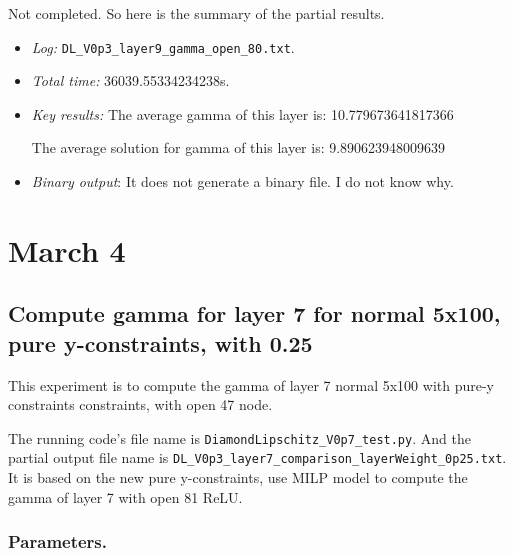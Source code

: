 \documentclass{llncs}
\begin{document}
Not completed. So here is the summary of the partial results.

\begin{itemize}
	\item \emph{Log:} \verb*|DL_V0p3_layer9_gamma_open_80.txt|.
	
	\item \emph{Total time:} 36039.55334234238s.
	
	\item \emph{Key results:}  The average gamma of this layer is:  10.779673641817366
	
	The average solution for gamma of this layer is:  9.890623948009639
	
	\item  \emph{Binary output}: It does not generate a binary file. I do not know why.
	
\end{itemize}

\section{March 4}


\subsection{Compute gamma for layer 7 for normal 5x100, pure y-constraints, with 0.25}

This experiment is to compute the gamma of layer 7 normal 5x100 with pure-y constraints constraints, with open 47 node.

\vspace*{1ex}

The running code's file name is \verb*|DiamondLipschitz_V0p7_test.py|. And the partial output file name is \verb*|DL_V0p3_layer7_comparison_layerWeight_0p25.txt|.  It is based on the new pure y-constraints, use MILP model to compute the gamma of layer 7 with open 81 ReLU.

\subsubsection*{Parameters.}
\end{document}
